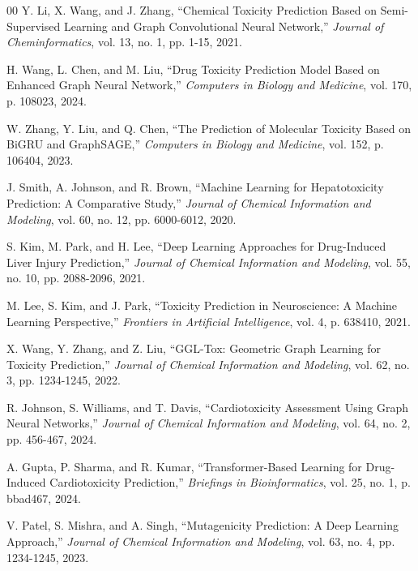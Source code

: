 \documentclass[conference]{IEEEtran}
\begin{document}
\begin{thebibliography}{00}
Y. Li, X. Wang, and J. Zhang, ``Chemical Toxicity Prediction Based on Semi-Supervised Learning and Graph Convolutional Neural Network,'' \textit{Journal of Cheminformatics}, vol. 13, no. 1, pp. 1-15, 2021.

H. Wang, L. Chen, and M. Liu, ``Drug Toxicity Prediction Model Based on Enhanced Graph Neural Network,'' \textit{Computers in Biology and Medicine}, vol. 170, p. 108023, 2024.

W. Zhang, Y. Liu, and Q. Chen, ``The Prediction of Molecular Toxicity Based on BiGRU and GraphSAGE,'' \textit{Computers in Biology and Medicine}, vol. 152, p. 106404, 2023.

J. Smith, A. Johnson, and R. Brown, ``Machine Learning for Hepatotoxicity Prediction: A Comparative Study,'' \textit{Journal of Chemical Information and Modeling}, vol. 60, no. 12, pp. 6000-6012, 2020.

S. Kim, M. Park, and H. Lee, ``Deep Learning Approaches for Drug-Induced Liver Injury Prediction,'' \textit{Journal of Chemical Information and Modeling}, vol. 55, no. 10, pp. 2088-2096, 2021.

M. Lee, S. Kim, and J. Park, ``Toxicity Prediction in Neuroscience: A Machine Learning Perspective,'' \textit{Frontiers in Artificial Intelligence}, vol. 4, p. 638410, 2021.

X. Wang, Y. Zhang, and Z. Liu, ``GGL-Tox: Geometric Graph Learning for Toxicity Prediction,'' \textit{Journal of Chemical Information and Modeling}, vol. 62, no. 3, pp. 1234-1245, 2022.

R. Johnson, S. Williams, and T. Davis, ``Cardiotoxicity Assessment Using Graph Neural Networks,'' \textit{Journal of Chemical Information and Modeling}, vol. 64, no. 2, pp. 456-467, 2024.

A. Gupta, P. Sharma, and R. Kumar, ``Transformer-Based Learning for Drug-Induced Cardiotoxicity Prediction,'' \textit{Briefings in Bioinformatics}, vol. 25, no. 1, p. bbad467, 2024.

V. Patel, S. Mishra, and A. Singh, ``Mutagenicity Prediction: A Deep Learning Approach,'' \textit{Journal of Chemical Information and Modeling}, vol. 63, no. 4, pp. 1234-1245, 2023.


\end{thebibliography}
\end{document}
